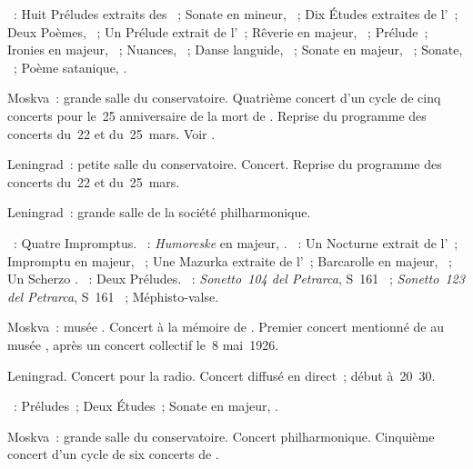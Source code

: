 \begin{description}
 \textsc{\Scriabine{}}~: Huit Préludes extraits des ~; Sonate en \kF \Sharp mineur, ~; Dix Études extraites de
 l'~; Deux Poèmes, ~; Un Prélude extrait de l'~;
 Rêverie en \kC majeur,  ~; Prélude~; Ironies en \kC
 majeur,  ~; Nuances,  ~; Danse
 languide,  ~; Sonate en \kF \Sharp majeur, ~;
 Sonate, ~; Poème satanique, .
 \item[\DateWithWeekDay{1940-03-27}]
 Moskva~: grande salle du conservatoire.
 Quatrième concert d'un cycle de cinq concerts pour le~25\ieme{}
 anniversaire de la mort de \Scriabine{}.
 Reprise du programme des concerts du~22 et du~25~mars.
 Voir \citet{Lazarev20}.
 \item[\DateWithWeekDay{1940-04-06}]
 Leningrad~: petite salle du conservatoire.
 Concert.
 Reprise du programme des concerts du~22 et du~25~mars.
 \item[\DateWithWeekDay{1940-04-22}]
 Leningrad~: grande salle de la société philharmonique.

 \textsc{\Schubert{}}~: Quatre Impromptus.
 \textsc{\Schumann{}}~: \emph{Humoreske} en \kB \Flat majeur, .
 \textsc{\Chopin{}}~: Un Nocturne extrait de l'~; Impromptu en \kG
 \Flat majeur, ~; Une Mazurka extraite de l'~; Barcarolle
 en \kF \Sharp majeur, ~; Un Scherzo \citep[selon][]{Nekrasova08}.
 \textsc{\Rachmaninov{}}~: Deux Préludes.
 \textsc{\Liszt{}}~: \emph{Sonetto~104 del Petrarca}, S~161 ~;
 \emph{Sonetto~123 del Petrarca}, S~161 ~; Méphisto-valse.
 \item[\DateWithWeekDay{1940-04-27}]
 Moskva~: musée \Scriabine{}.
 Concert à la mémoire de \Scriabine{}.
 Premier concert mentionné de \VSofronitsky{} au musée \Scriabine{}, après
 un concert collectif le~8 mai~1926.
 \item[\DateWithWeekDay{1940-04-29}]
 Leningrad.
 Concert pour la radio.
 Concert diffusé en direct~; début à~20~30.

 \textsc{\Scriabine{}}~: Préludes~; Deux Études~; Sonate en \kF \Sharp
 majeur, .
 \item[\DateWithWeekDay{1940-05-03}]
 Moskva~: grande salle du conservatoire.
 Concert philharmonique.
 Cinquième concert d'un cycle de six concerts de \VSofronitsky{}.


\end{description}
